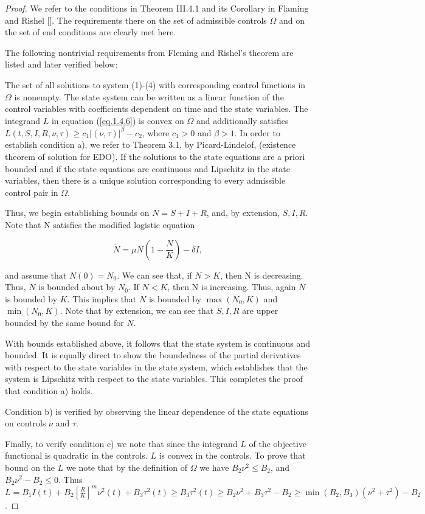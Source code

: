 \begin{proof}
We refer to the conditions in Theorem III.4.1 and its Corollary in Flaming and Rishel []. The requirements there on the set of admissible controls $\Omega$ and on the set of end conditions are clearly met here.

The following nontrivial requirements from Fleming and Rishel’s theorem are listed and later verified below:

The set of all solutions to system (1)-(4) with corresponding control functions in $\Omega$ is nonempty.
The state system can be written as a linear function of the control variables with coefficients dependent on time and the state variables.
The integrand $L$ in equation (\ref{eq.1.4.6}) is convex on $\Omega$ and additionally satisfies $L(t,S,I,R,\nu,\tau) \geq c_1 |(\nu,\tau)|^{\beta}-c_2$, where $c_1>0$ and $\beta>1$.
In order to establish condition a), we refer to Theorem 3.1, by Picard-Lindelof, (existence theorem of solution for EDO). If the solutions to the state equations are a priori bounded and if the state equations are continuous and Lipschitz in the state variables, then there is a unique solution corresponding to every admissible control pair in $\Omega$.

Thus, we begin establishing bounds on $N=S+I+R$, and, by extension, $S,I,R$. Note that N satisfies the modified logistic equation

\begin{equation}\label{eq.1.4.8}
\dot{N}=\mu N\left(1-\frac{N}{K}\right)-\delta I,
\end{equation}

and assume that $N(0)=N_0$. We can see that, if $N>K$, then N is decreasing. Thus, $N$ is bounded about by $N_0$. If $N<K$, then N is increasing. Thus, again $N$ is bounded by $K$. This implies that $N$ is bounded by $\max (N_0,K)$ and $\min (N_0,K)$. Note that by extension, we can see that $S,I,R$ are upper bounded by the same bound for $N$.

With bounds established above, it follows that the state system is continuous and bounded. It is equally direct to show the boundedness of the partial derivatives with respect to the state variables in the state system, which establishes that the system is Lipschitz with respect to the state variables. This completes the proof that condition a) holds.

Condition b) is verified by observing the linear dependence of the state equations on controls $\nu$ and  $\tau$.

Finally, to verify condition c) we note that since the integrand $L$ of the objective functional is quadratic in the controls. $L$ is convex in the controls. To prove that bound on the $L$ we note that by the definition of $\Omega$ we have $B_2 \nu^2\leq B_2$, and $B_2\nu^2-B_2\leq 0$. Thus $L=B_1 I(t)+B_2[\frac{R}{K}]^m \nu^2(t) +B_3\tau^2(t)\geq B_3\tau^2 (t)\geq B_2\nu^2+B_3\tau^2-B_2\geq \min (B_2,B_3)(\nu^2+\tau^2)-B_2$.
\end{proof}


